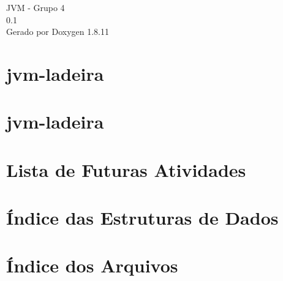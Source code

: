 \documentclass[twoside]{book}
\newcommand{\+}{\discretionary{\mbox{\scriptsize$\hookleftarrow$}}{}{}}
\newcommand{\clearemptydoublepage}{%
  \newpage{\pagestyle{empty}\cleardoublepage}%
}
\begin{document}
\hypersetup{pageanchor=false,
             bookmarksnumbered=true,
             pdfencoding=unicode
            }
\begin{titlepage}
\vspace*{7cm}
\begin{center}%
{\Large J\+VM -\/ Grupo 4 \\[1ex]\large 0.\+1 }\\
\vspace*{1cm}
{\large Gerado por Doxygen 1.8.11}\\
\end{center}
\end{titlepage}
\clearemptydoublepage
\tableofcontents
\clearemptydoublepage
{}
\hypersetup{pageanchor=true}

\chapter{jvm-\/ladeira}
\label{index}\hypertarget{index}{}
\chapter{jvm-\/ladeira}
\label{md_INDEX}
\hypertarget{md_INDEX}{}

\chapter{Lista de Futuras Atividades}
\label{todo}
\hypertarget{todo}{}

\chapter{Índice das Estruturas de Dados}

\chapter{Índice dos Arquivos}

\end{document}
